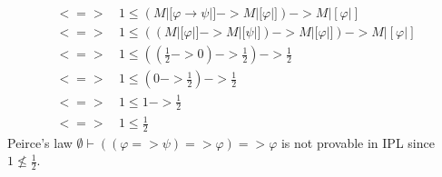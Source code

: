 \begin{answer}
\begin{itemize}
\begin{align*}
                <=>\, & 1 \le (M|[\varphi \to \psi|] -> M|[\varphi|]) -> M|[\varphi|] \\
                <=>\, & 1 \le ((M|[\varphi|] -> M|[\psi|]) -> M|[\varphi|]) -> M|[\varphi|] \\
                <=>\, & 1 \le ((\frac{1}{2} -> 0) -> \frac{1}{2}) -> \frac{1}{2} \\
                <=>\, & 1 \le (0 -> \frac{1}{2}) -> \frac{1}{2} \\
                <=>\, & 1 \le 1 -> \frac{1}{2} \\
                <=>\, & 1 \le \frac{1}{2}
            \end{align*}
            Peirce's law $\emptyset \vdash ((\varphi => \psi) => \varphi) => \varphi$ is not provable in IPL since $1 \nleq \frac{1}{2}$.
    \end{itemize}
\end{answer}



